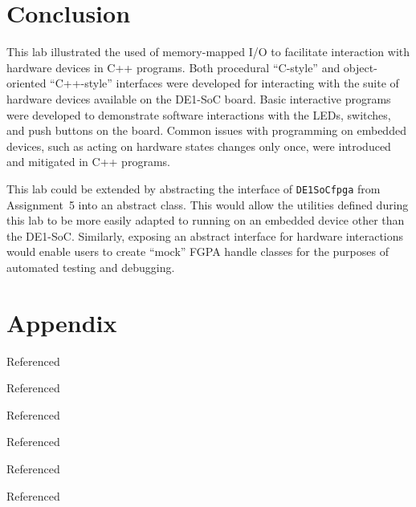 \documentclass[11pt, letterpaper]{article} %
\begin{document}
\section*{Conclusion}

This lab illustrated the used of memory-mapped I/O to facilitate interaction with hardware devices in C++ programs. Both procedural ``C-style'' and object-oriented ``C++-style'' interfaces were developed for interacting with the suite of hardware devices available on the DE1-SoC board. Basic interactive programs were developed to demonstrate software interactions with the LEDs, switches, and push buttons on the board. Common issues with programming on embedded devices, such as acting on hardware states changes only once, were introduced and mitigated in C++ programs.

This lab could be extended by abstracting the interface of \texttt{DE1SoCfpga} from Assignment~5 into an abstract class. This would allow the utilities defined during this lab to be more easily adapted to running on an embedded device other than the DE1-SoC. Similarly, exposing an abstract interface for hardware interactions would enable users to create ``mock'' FGPA handle classes for the purposes of automated testing and debugging.


\clearpage
\section*{Appendix}
\renewcommand{\thelstlisting}{A.\arabic{lstlisting}}



Referenced \cite{so-safe-unaligned,so-arm-unaligned}

Referenced \cite{de1-soc-linux-manual,open-std-N4659}

Referenced \cite{cppreference-inc-op}

Referenced \cite{cppreference-thread,cppreference-user-lit,so-sleep,open-std-P0627R0}

Referenced \cite{stroustrup-c++-core-guidelines}


Referenced \cite{stroustrup-c++-core-guidelines}






\clearpage



\end{document}
